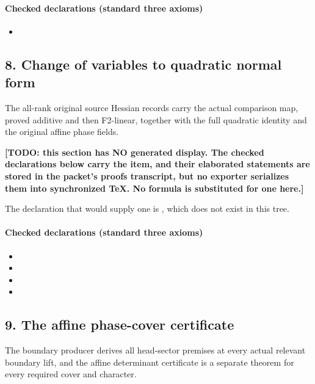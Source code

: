 \paragraph{Checked declarations (standard three axioms)}
\begin{itemize}
\item {}
\end{itemize}

\subsection*{8. Change of variables to quadratic normal form}
The all-rank original source Hessian records carry the actual comparison map, proved additive and then F2-linear, together with the full quadratic identity and the original affine phase fields.

\par\noindent\textbf{[TODO: this section has NO generated display. The checked declarations below carry the item, and their elaborated statements are stored in the packet's proofs transcript, but no exporter serializes them into synchronized TeX. No formula is substituted for one here.]}
\par\noindent The declaration that would supply one is , which does not exist in this tree.
\paragraph{Checked declarations (standard three axioms)}
\begin{itemize}
\item {}
\item {}
\item {}
\item {}
\end{itemize}

\subsection*{9. The affine phase-cover certificate}
The boundary producer derives all head-sector premises at every actual relevant boundary lift, and the affine determinant certificate is a separate theorem for every required cover and character.

